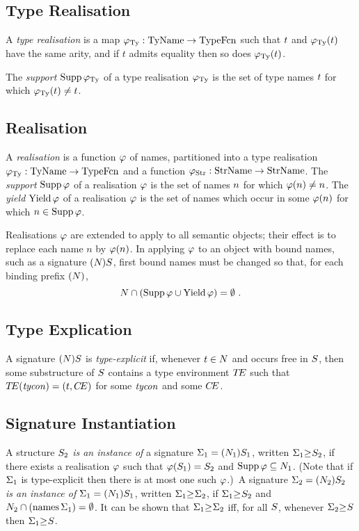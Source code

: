 \subsection{Type Realisation}
%
A {\sl type realisation} is a map
$\tyrea:\TyNames\to\TypeFcn$
such that
$\t$ and $\tyrea(\t)$ have the same arity, and
if $t$ admits equality then so does $\tyrea(\t)$.

The {\sl support} $\Supp\tyrea$ of a type realisation $\tyrea$ is the set of
type names $\t$ for which $\tyrea(\t)\ne\t$.
%
\subsection{Realisation}
\label{realisation-sec}
A {\sl realisation} is a function $\rea$ of names,
partitioned into a type realisation $\tyrea:\TyNames\to\TypeFcn$
and a function $\strrea : \StrNames\to\StrNames$.
The {\sl support} $\Supp\rea$
of a realisation $\rea$ is the set of
names $\n$ for which $\rea(\n)\ne\n$.
The {\sl yield} $\Yield\rea$ of a realisation $\rea$ is the set of
names which occur in some $\rea(\n)$ for which $\n\in\Supp\rea$.

Realisations $\rea$ are extended to apply to all semantic objects; their
effect is to
replace each name $n$ by $\rea(\n)$.  In applying $\rea$ to an object with
bound names, such as a signature $\longsig{}$, first bound names must be
changed so that, for each binding prefix $(\N)$,
\[\N\cap(\Supp\rea\cup\Yield\rea)=\emptyset\ .\]
%
\subsection{Type Explication}
\label{type-explication-sec}
A signature $(\N)\S$ is {\sl type-explicit\/} if,
whenever $\t\in\N$ and occurs free in $\S$, then some substructure of
$\S$ contains a type environment $\TE$ such that
$\TE(\tycon)=(\t,\CE)$ for some $\tycon$ and some $\CE$.  
%
\subsection{Signature Instantiation}
A structure $\S_2$ {\sl is an instance of} a signature
$\sig_1=\longsig{1}$,
written $\siginst{\sig_1}{}{\S_2}$, if there exists a realisation
$\rea$
such that $\rea(\S_1)=\S_2$ and $\Supp\rea\subseteq\N_1$.
(Note that if $\sig_1$ is type-explicit then there is at most one
such $\rea$.)\ 
A signature
$\sig_2=\longsig{2}$ {\sl is an instance of}
$\sig_1 =\longsig{1}$,
written $\siginst{\sig_1}{}{\sig_2}$, if
$\siginst{\sig_1}{}{\S_2}$ and $\N_2\cap(\NamesFcn\sig_1)=\emptyset$.
It can be shown that $\siginst{\sig_1}{}{\sig_2}$ iff, for all $\S$,
whenever $\siginst{\sig_2}{}{\S}$ then $\siginst{\sig_1}{}{\S}$.

